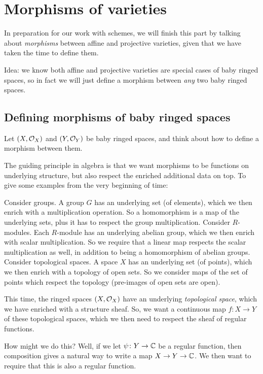 \chapter{Morphisms of varieties}
\label{ch:morphisms_of_varieties}
In preparation for our work with schemes,
we will finish this part by talking about \emph{morphisms}
between affine and projective varieties,
given that we have taken the time to define them.

Idea: we know both affine and projective varieties are special
cases of baby ringed spaces, so in fact we will just define a morphism
between \emph{any} two baby ringed spaces.

\section{Defining morphisms of baby ringed spaces}
Let $(X, \mathcal O_X)$ and $(Y, \mathcal O_Y)$ be baby ringed spaces, and think
about how to define a morphism between them.

The guiding principle in algebra is that we want morphisms
to be functions on underlying structure, but also respect
the enriched additional data on top.
To give some examples from the very beginning of time:
\begin{example}
	\listhack
	\begin{itemize}
	\ii Consider groups.
	A group $G$ has an underlying set (of elements),
	which we then enrich with a multiplication operation.
	So a homomorphism is a map of the underlying sets,
	plus it has to respect the group multiplication.
	\ii Consider $R$-modules.
	Each $R$-module has an underlying abelian group,
	which we then enrich with scalar multiplication.
	So we require that a linear map respects the scalar multiplication as well,
	in addition to being a homomorphism of abelian groups.
	\ii Consider topological spaces.
	A space $X$ has an underlying set (of points),
	which we then enrich with a topology of open sets.
	So we consider maps of the set of points
	which respect the topology (pre-images of open sets are open).
	\end{itemize}
\end{example}
This time, the ringed spaces $(X, \mathcal O_X)$ have an underlying
\emph{topological space}, which we have enriched with a structure sheaf.
So, we want a continuous map $f \colon X \to Y$ of these topological spaces,
which we then need to respect the sheaf of regular functions.

How might we do this? Well, if we let $\psi \colon Y \to \mathbb C$
be a regular function, then composition gives a natural way to
write a map $X \to Y \to \mathbb C$.
We then want to require that this is also a regular function.

